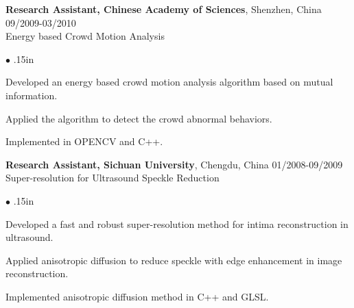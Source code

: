 \documentclass[line,margin]{res}
\newenvironment{bullets}{\begin{list}{\tiny$\bullet$}{\topsep 0pt \itemsep -2pt \leftmargin .15in}}{\vspace*{4pt}\end{list}}
\begin{document}
\begin{resume}
\textbf{Research Assistant, Chinese Academy of Sciences}, Shenzhen, China   \hfill      09/2009-03/2010 \\ %
Energy based Crowd Motion Analysis
\begin{bullets}
\item Developed an energy based crowd motion analysis algorithm based on mutual information.
\item Applied the algorithm to detect the crowd abnormal behaviors.
\item Implemented in OPENCV and C++.
\end{bullets}
\vspace{-.1in}
\textbf{Research Assistant, Sichuan University}, Chengdu, China \hfill      01/2008-09/2009 \\%
Super-resolution for Ultrasound Speckle Reduction
\begin{bullets}
\item Developed a fast and robust super-resolution method for intima reconstruction in
ultrasound. 
\item Applied anisotropic diffusion to reduce speckle with edge enhancement in image reconstruction.
\item Implemented anisotropic diffusion method in C++ and GLSL.
\end{bullets} %


\end{resume}
\end{document}

